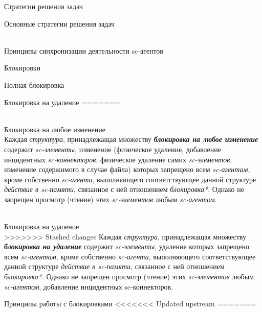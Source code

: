 \begin{frame}{Стратегии решения задач}
\begin{frame}{\large Основные стратегии решения задач}
\begin{textitemize}
\begin{frame}{\\Принципы синхронизации деятельности sc-агентов}
\begin{frame}{Блокировки}
\begin{frame}{ Полная блокировка}
\begin{frame}{Блокировка на удаление}
=======
\begin{frame}{\\Блокировка на любое изменение}
\topline
\vspace{15}
 \\

  Каждая \textit{структура}, принадлежащая множеству \textbf{\textit{блокировка на любое изменение}} содержит \textit{sc-элементы}, изменение (физическое удаление, добавление инцидентных \textit{sc-коннекторов}, физическое удаление самих \textit{\mbox{sc-элементов}}, изменение содержимого в случае файла) которых запрещено всем \textit{sc-агентам}, кроме собственно \textit{sc-агента}, выполняющего соответствующее данной структуре \textit{действие в sc-памяти}, связанное с ней отношением \textit{блокировка*}. Однако не запрещен просмотр (чтение) этих \textit{sc-элементов} любым \textit{sc-агентом}.  
\end{frame}

\begin{frame}{\\Блокировка на удаление}
\topline
\vspace{15}
 \\

>>>>>>> Stashed changes
  Каждая \textit{структура}, принадлежащая множеству \textbf{\textit{блокировка на удаление}} содержит \textit{sc-элементы}, удаление которых запрещено всем \textit{sc-агентам}, кроме собственно \textit{sc-агента}, выполняющего соответствующее данной структуре \textit{действие в sc-памяти}, связанное с ней отношением \textit{блокировка*}. Однако не запрещен просмотр (чтение) этих \textit{sc-элементов} любым \textit{sc-агентом}, добавление инцидентных sc-коннекторов.  
\end{frame}
    
    
\begin{frame}{Принципы работы с блокировками}
<<<<<<< Updated upstream
=======
\topline
\vspace{30}
 \\


\end{frame}
\end{frame}
\end{frame}
\end{frame}
\end{frame}
\end{textitemize}
\end{frame}
\end{frame}
